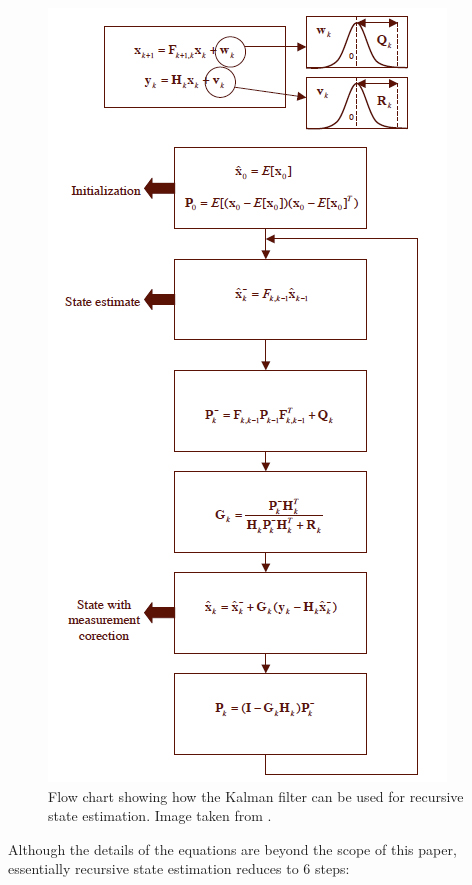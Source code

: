 \documentclass[11pt]{article}
\begin{document}
\begin{figure}[H]
\centering
\includegraphics[scale=.6]{img/stateestimation.jpg}
\caption{Flow chart showing how the Kalman filter can be used for recursive state estimation. Image taken from \cite{kalman}.}
\label{fig:stateestimation}
\end{figure}

Although the details of the equations are beyond the scope of this paper, essentially recursive state estimation reduces to 6 steps:
\end{document}
